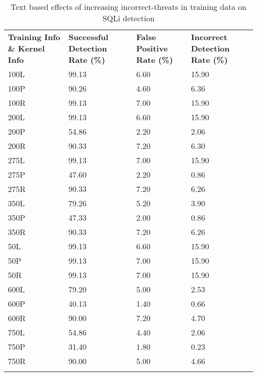 \begin{appendices}
\begin{longtable}{|p{1.5in}|p{1in}|p{1in}|p{1in}|}
	\hline
	\textbf{Training Info \& Kernel Info} & \textbf{Successful Detection Rate (\%)} & \textbf{False Positive Rate (\%)} & \textbf{Incorrect Detection Rate (\%)}  \\
	\hhline{|=|=|=|=|}
 	100L & 99.13 & 6.60 & 15.90 \\ \hline
 	100P & 90.26 & 4.60 &  6.36 \\ \hline
 	100R & 99.13 & 7.00 & 15.90 \\ \hline
 	200L & 99.13 & 6.60 & 15.90 \\ \hline
 	200P & 54.86 & 2.20 &  2.06 \\ \hline
 	200R & 90.33 & 7.20 &  6.30 \\ \hline
 	275L & 99.13 & 7.00 & 15.90 \\ \hline
 	275P & 47.60 & 2.20 &  0.86 \\ \hline
 	275R & 90.33 & 7.20 &  6.26 \\ \hline
 	350L & 79.26 & 5.20 &  3.90 \\ \hline
 	350P & 47.33 & 2.00 &  0.86 \\ \hline
 	350R & 90.33 & 7.20 &  6.26 \\ \hline
  	50L & 99.13 & 6.60 & 15.90 \\ \hline
  	50P & 99.13 & 7.00 & 15.90 \\ \hline
  	50R & 99.13 & 7.00 & 15.90 \\ \hline
 	600L & 79.20 & 5.00 &  2.53 \\ \hline
 	600P & 40.13 & 1.40 &  0.66 \\ \hline
 	600R & 90.00 & 7.20 &  4.70 \\ \hline
 	750L & 54.86 & 4.40 &  2.06 \\ \hline
 	750P & 31.40 & 1.80 &  0.23 \\ \hline
 	750R & 90.00 & 5.00 &  4.66 \\ \hline
 	\caption[]{Text based effects of increasing incorrect-threats in training data on SQLi detection}
 	\label{app:sqlIncorrectThreatText}
\end{longtable}
	

\end{appendices}
